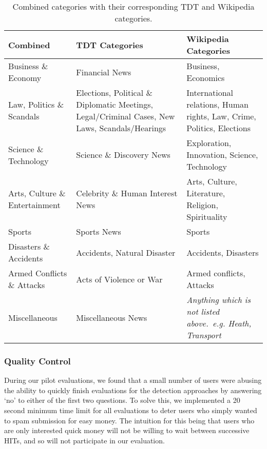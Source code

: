 \begin{table}[h]

	\centering
	\caption{Combined categories with their corresponding TDT and Wikipedia categories.}
	\label{collection:table:catTable}

	\small
	\begin{tabulary}{\textwidth}{l L L}
	\toprule
	\textbf{Combined} & \textbf{TDT Categories} & \textbf{Wikipedia Categories}  \\
	\midrule
	Business \& Economy & Financial News & Business, Economics \\
	\midrule
	Law, Politics \& Scandals & Elections, Political \& Diplomatic Meetings, Legal/Criminal Cases, New Laws, Scandals/Hearings & International relations, Human rights, Law, Crime, Politics, Elections \\
	\midrule
	Science \& Technology & Science \& Discovery News & Exploration, Innovation, Science, Technology \\
	\midrule
	Arts, Culture \& Entertainment & Celebrity \& Human Interest News & Arts, Culture, Literature, Religion, Spirituality \\
	\midrule
	Sports & Sports News & Sports \\
	\midrule
	Disasters \& Accidents & Accidents, Natural Disaster & Accidents, Disasters \\
	\midrule
	Armed Conflicts \& Attacks & Acts of Violence or War & Armed conflicts, Attacks \\
	\midrule
	Miscellaneous & Miscellaneous News & \emph{Anything which is not listed above.\ e.g. Heath, Transport}  \\
	\bottomrule
	\end{tabulary}

\end{table}


\subsubsection{Quality Control}
\label{sec:spam}
During our pilot evaluations, we found that a small number of users were abusing the ability to quickly finish evaluations for the detection approaches by answering `no' to either of the first two questions. To solve this,
we implemented a 20 second minimum time limit for all evaluations to deter users who simply wanted to spam submission for easy money. The intuition for this being that users who are only interested quick money will not be willing to wait between successive HITs, and so will not participate in our evaluation.

